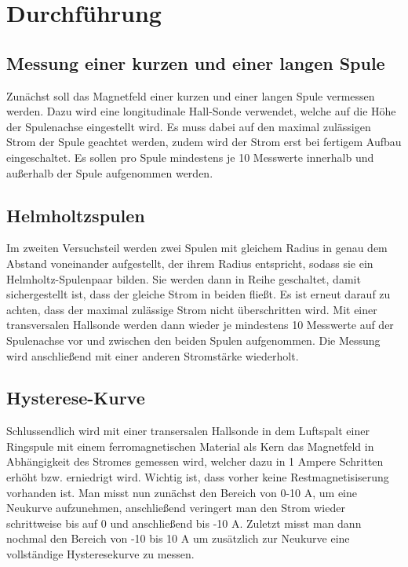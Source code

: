 \section{Durchführung}
\subsection{Messung einer kurzen und einer langen Spule}
Zunächst soll das Magnetfeld einer kurzen und einer langen Spule vermessen werden.
Dazu wird eine longitudinale Hall-Sonde verwendet, welche auf die Höhe der
Spulenachse eingestellt wird. Es muss dabei auf den maximal zulässigen Strom der Spule
geachtet werden, zudem wird der Strom erst bei fertigem Aufbau eingeschaltet.
Es sollen pro Spule mindestens je 10 Messwerte innerhalb und außerhalb der Spule
aufgenommen werden.

\subsection{Helmholtzspulen}
Im zweiten Versuchsteil werden zwei Spulen mit gleichem Radius in genau dem Abstand voneinander
aufgestellt, der ihrem Radius entspricht, sodass sie ein Helmholtz-Spulenpaar bilden.
Sie werden dann in Reihe geschaltet, damit sichergestellt ist, dass der gleiche
Strom in beiden fließt. Es ist erneut darauf zu achten, dass der maximal zulässige Strom
nicht überschritten wird.
Mit einer transversalen Hallsonde werden dann wieder je mindestens 10 Messwerte
auf der Spulenachse vor und zwischen den beiden Spulen aufgenommen.
Die Messung wird anschließend mit einer anderen Stromstärke wiederholt.

\subsection{Hysterese-Kurve}
Schlussendlich wird mit einer transersalen Hallsonde in dem Luftspalt einer Ringspule
mit einem ferromagnetischen Material als Kern das Magnetfeld in Abhängigkeit des
Stromes gemessen wird, welcher dazu in 1 Ampere Schritten erhöht bzw. erniedrigt wird.
Wichtig ist, dass vorher keine Restmagnetisiserung vorhanden ist.
Man misst nun zunächst den Bereich von 0-10 A, um eine Neukurve aufzunehmen, anschließend
veringert man den Strom wieder schrittweise bis auf 0 und anschließend bis -10 A.
Zuletzt misst man dann nochmal den Bereich von -10 bis 10 A um zusätzlich zur Neukurve eine
vollständige Hysteresekurve zu messen.
